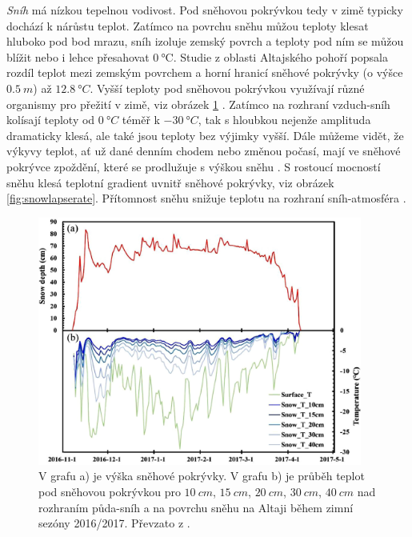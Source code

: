 \textit{Sníh} má nízkou tepelnou vodivost. Pod sněhovou pokrývkou tedy v zimě typicky dochází k nárůstu teplot. Zatímco na povrchu sněhu můžou teploty klesat hluboko pod bod mrazu, sníh izoluje zemský povrch a teploty pod ním se můžou blížit nebo i lehce přesahovat $\SI{0}{\celsius}$. Studie z oblasti Altajského pohoří popsala rozdíl teplot mezi zemským povrchem a horní hranicí sněhové pokrývky (o výšce $\SI{0.5}{m}$) až $\SI{12.8}{\degree C}$. Vyšší teploty pod sněhovou pokrývkou využívají různé organismy pro přežití v zimě, viz obrázek \ref{fig:snowtempaltai} \parencite{hirakawahirofumi2018}. Zatímco na rozhraní vzduch-sníh kolísají teploty od $\SI{0}{\degree C}$ téměř k $\SI{-30}{\degree C}$, tak s hloubkou nejenže amplituda dramaticky klesá, ale také jsou teploty bez výjimky vyšší. Dále můžeme vidět, že výkyvy teplot, ať už dané denním chodem nebo změnou počasí, mají ve sněhové pokrývce zpoždění, které se prodlužuje s výškou sněhu \parencite{zhangwei2021}. S rostoucí mocností sněhu klesá teplotní gradient uvnitř sněhové pokrývky, viz obrázek \ref{fig:snowlapserate}. Přítomnost sněhu snižuje teplotu na rozhraní sníh-atmosféra \parencite{zhangwei2021}.

\begin{figure}
	\centering
	\includegraphics[width=0.95\textwidth]{img/ch1/snowtempaltai.png}
	\caption{V grafu a) je výška sněhové pokrývky. V grafu b) je průběh teplot pod sněhovou pokrývkou pro $\SI{10}{cm}$, $\SI{15}{cm}$, $\SI{20}{cm}$, $\SI{30}{cm}$, $\SI{40}{cm}$ nad rozhraním půda-sníh a na povrchu sněhu na Altaji během zimní sezóny 2016/2017. Převzato z \parencite{zhangwei2021}.}
	\label{fig:snowtempaltai}
\end{figure}

